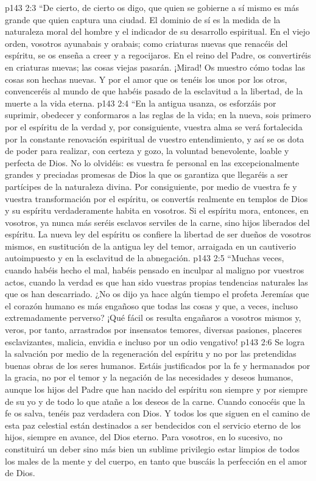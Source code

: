 \vs p143 2:3 “De cierto, de cierto os digo, que quien se gobierne a sí mismo es más grande que quien captura una ciudad. El dominio de sí es la medida de la naturaleza moral del hombre y el indicador de su desarrollo espiritual. En el viejo orden, vosotros ayunabais y orabais; como criaturas nuevas que renacéis del espíritu, se os enseña a creer y a regocijaros. En el reino del Padre, os convertiréis en criaturas nuevas; las cosas viejas pasarán. ¡Mirad! Os muestro cómo todas las cosas son hechas nuevas. Y por el amor que os tenéis los unos por los otros, convenceréis al mundo de que habéis pasado de la esclavitud a la libertad, de la muerte a la vida eterna.
\vs p143 2:4 “En la antigua usanza, os esforzáis por suprimir, obedecer y conformaros a las reglas de la vida; en la nueva, sois primero  por el espíritu de la verdad y, por consiguiente, vuestra alma se verá fortalecida por la constante renovación espiritual de vuestro entendimiento, y así se os dota de poder para realizar, con certeza y gozo, la voluntad benevolente, loable y perfecta de Dios. No lo olvidéis: es vuestra fe personal en las excepcionalmente grandes y preciadas promesas de Dios la que os garantiza que llegaréis a ser partícipes de la naturaleza divina. Por consiguiente, por medio de vuestra fe y vuestra transformación por el espíritu, os convertís realmente en templos de Dios y su espíritu verdaderamente habita en vosotros. Si el espíritu mora, entonces, en vosotros, ya nunca más seréis esclavos serviles de la carne, sino hijos liberados del espíritu. La nueva ley del espíritu os confiere la libertad de ser dueños de vosotros mismos, en sustitución de la antigua ley del temor, arraigada en un cautiverio autoimpuesto y en la esclavitud de la abnegación.
\vs p143 2:5 “Muchas veces, cuando habéis hecho el mal, habéis pensado en inculpar al maligno por vuestros actos, cuando la verdad es que han sido vuestras propias tendencias naturales las que os han descarriado. ¿No os dijo ya hace algún tiempo el profeta Jeremías que el corazón humano es más engañoso que todas las cosas y que, a veces, incluso extremadamente perverso? ¡Qué fácil os resulta engañaros a vosotros mismos y, veros, por tanto, arrastrados por insensatos temores, diversas pasiones, placeres esclavizantes, malicia, envidia e incluso por un odio vengativo!
\vs p143 2:6 Se logra la salvación por medio de la regeneración del espíritu y no por las pretendidas buenas obras de los seres humanos. Estáis justificados por la fe y hermanados por la gracia, no por el temor y la negación de las necesidades y deseos humanos, aunque los hijos del Padre que han nacido del espíritu son siempre y por siempre  de su yo y de todo lo que atañe a los deseos de la carne. Cuando conocéis que la fe os salva, tenéis paz verdadera con Dios. Y todos los que siguen en el camino de esta paz celestial están destinados a ser bendecidos con el servicio eterno de los hijos, siempre en avance, del Dios eterno. Para vosotros, en lo sucesivo, no constituirá un deber sino más bien un sublime privilegio estar limpios de todos los males de la mente y del cuerpo, en tanto que buscáis la perfección en el amor de Dios.
